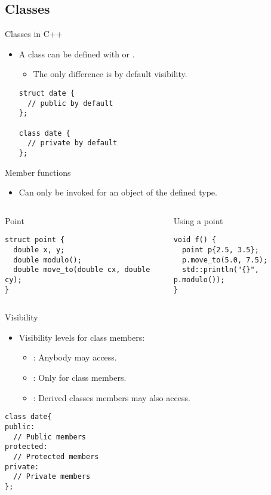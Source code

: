 \subsection{Classes}

\begin{frame}[t,fragile]{Classes in C++}
\begin{itemize}
  \item A class can be defined with  or .
    \begin{itemize}
      \item The only difference is by default visibility.
    \end{itemize}
\begin{lstlisting}
struct date {
  // public by default
};

class date {
  // private by default
};
\end{lstlisting}
\end{itemize}
\end{frame}

\begin{frame}[t,fragile]{Member functions}
\begin{itemize}
  \item Can only be invoked for an object of the defined type.
\end{itemize}

\begin{columns}[T]

\begin{block}{Point}
\begin{lstlisting}
struct point {
  double x, y;
  double modulo();
  double move_to(double cx, double cy);
}
\end{lstlisting}
\end{block}

\begin{block}{Using a point}
\begin{lstlisting}
void f() {
  point p{2.5, 3.5};
  p.move_to(5.0, 7.5);
  std::println("{}", p.modulo());
}
\end{lstlisting}
\end{block}
\end{columns}

\end{frame}

\begin{frame}[t,fragile]{Visibility}
\begin{itemize}
  \item Visibility levels for class members:
    \begin{itemize}
      \item {}: Anybody may access.
      \item {}: Only for class members.
      \item {}: Derived classes members may also access.
    \end{itemize}
\end{itemize}
\vfill
\begin{lstlisting}
class date{
public:
  // Public members
protected:
  // Protected members
private:
  // Private members
};
\end{lstlisting}
\end{frame}
